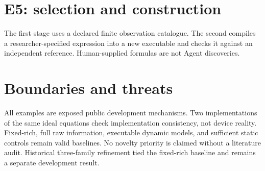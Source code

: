 \documentclass[10pt]{article}
\begin{document}
\section{E5: selection and construction}
The first stage uses a declared finite observation catalogue. The second compiles a researcher-specified expression into a new executable and checks it against an independent reference. Human-supplied formulas are not Agent discoveries.
\section{Boundaries and threats}
All examples are exposed public development mechanisms. Two implementations of the same ideal equations check implementation consistency, not device reality. Fixed-rich, full raw information, executable dynamic models, and sufficient static controls remain valid baselines. No novelty priority is claimed without a literature audit. Historical three-family refinement tied the fixed-rich baseline and remains a separate development result.
\end{document}
